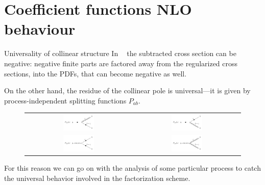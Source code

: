 \documentclass[9pt]{beamer}
\DeclareMathOperator{\msbar}{\overline{MS}}
\begin{document}
\section{Coefficient functions NLO behaviour}
\begin{frame}{Universality of collinear structure}
    In $\msbar$ the subtracted cross section can be negative: negative finite
    parts are factored away from the regularized cross sections, into the PDFs,
    that can become negative as well.

    On the other hand, the residue of the collinear pole is universal—it is
    given by process-independent splitting functions $P_{ab}$.
    \begin{figure}
        \begin{tabular}{cc}
          \includegraphics[width=0.3\textwidth]{pictures/feynd/Pqq} &   \includegraphics[width=0.3\textwidth]{pictures/feynd/Pgq} \\
          \includegraphics[width=0.3\textwidth]{pictures/feynd/Pqg} &   \includegraphics[width=0.3\textwidth]{pictures/feynd/Pgg} \\
        \end{tabular}
    \end{figure}

    For this reason we can go on with the analysis of some particular process
    to catch the universal behavior involved in the factorization scheme.
\end{frame}
\end{document}
